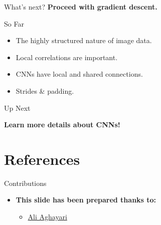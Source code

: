 \documentclass[default, aspectratio=169]{beamer}
\begin{document}
	
	\begin{frame}{What's next?}
		\centering \large \textbf{Proceed with gradient descent.}
	\end{frame}
	
	\begin{frame}{So Far}
		
		\begin{itemize}
			\item The highly structured nature of image data.
			\item Local correlations are important.
			\item CNNs have local and shared connections.
			\item Strides \& padding.
		\end{itemize}
		
	\end{frame}
	
	\begin{frame}{Up Next}
		
		\centering \large \textbf{Learn more details about CNNs!}
		
	\end{frame}
	
	
	
	\section{References}
	
	\begin{frame}{Contributions}
		\begin{itemize}
			\item \textbf{This slide has been prepared thanks to:}
			\begin{itemize}
				\setlength{\itemsep}{10pt}
				\item \href{https://github.com/Ali0281}{Ali Aghayari}
			\end{itemize}
		\end{itemize}
		
	\end{frame}
	
	\begin{frame}[allowframebreaks]
		
		
		\nocite{*}
	\end{frame}
	
	
	
	
\end{document}
